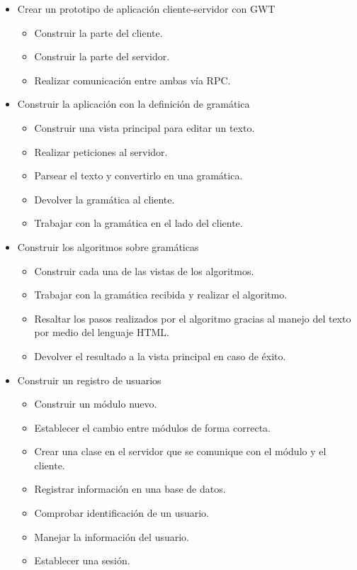 \begin{itemize}
\item Crear un prototipo de aplicación cliente-servidor con GWT

	\begin{itemize}
	\item Construir la parte del cliente.
	\item Construir la parte del servidor. 
	\item Realizar comunicación entre ambas vía RPC.
	\end{itemize}

\item Construir la aplicación con la definición de gramática
	\begin{itemize}
	\item Construir una vista principal para editar un texto.
	\item Realizar peticiones al servidor. 
	\item Parsear el texto y convertirlo en una gramática.
	\item Devolver la gramática al cliente.
	\item Trabajar con la gramática en el lado del cliente.
	\end{itemize}
\item Construir los algoritmos sobre gramáticas
	\begin{itemize}
	\item Construir cada una de las vistas de los algoritmos.
	\item Trabajar con la gramática recibida y realizar el algoritmo.
	\item Resaltar los pasos realizados por el algoritmo gracias al manejo del texto por medio del lenguaje HTML.
	\item Devolver el resultado a la vista principal en caso de éxito.
	\end{itemize}
\item Construir un registro de usuarios
	\begin{itemize}
	\item Construir un módulo nuevo.
	\item Establecer el cambio entre módulos de forma correcta.
	\item Crear una clase en el servidor que se comunique con el módulo y el cliente.
	\item Registrar información en una base de datos.
	\item Comprobar identificación de un usuario.
	\item Manejar la información del usuario.
	\item Establecer una sesión.
	\end{itemize}
\end{itemize}
